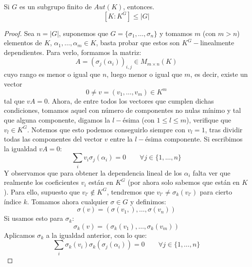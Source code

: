 \begin{prop}[Artin]
    Si $G$ es un subgrupo finito de $Aut(K)$, entonces.
    \begin{equation*}
        \left[K:K^G\right] \leq |G|
    \end{equation*}
    \begin{proof}
        Sea $n=|G|$, suponemos que $G = \{\sigma_1, \ldots, \sigma_n\}$ y tomamos $m$ (con $m>n$) elementos de $K$, $\alpha_1,\ldots,\alpha_m \in K$, basta probar que estos son $K^G-$linealmente dependientes. Para verlo, formamos la matriz:
        \begin{equation*}
            A = (\sigma_{j}(\alpha_i))_{i,j} \in  M_{m\times n}(K)
        \end{equation*}
        cuyo rango es menor o igual que $n$, luego menor o igual que $m$, es decir, existe un vector
        \begin{equation*}
            0\neq v = (v_1, \ldots, v_m) \in K^m
        \end{equation*}
        tal que $vA = 0$. Ahora, de entre todos los vectores que cumplen dichas condiciones, tomamos aquel con número de componentes no nulas mínimo y tal que alguna componente, digamos la $l-$ésima (con $1\leq l\leq m$), verifique que $v_l \in K^G$. Notemos que esto podemos conseguirlo siempre con $v_l = 1$, tras dividir todas las componentes del vector $v$ entre la $l-$ésima componente. Si escribimos la igualdad $vA = 0$:
        \begin{equation*}
            \sum_i v_i \sigma_j(\alpha_i) = 0 \qquad \forall j \in \{1,\ldots,n\}
        \end{equation*}
        Y observamos que para obtener la dependencia lineal de los $\alpha_i$ falta ver que realmente los coeficientes $v_i$ están en $K^G$ (por ahora solo sabemos que están en $K$). Para ello, supuesto que $v_{l'}\notin K^G$, tendremos que $v_{l'} \neq \sigma_k(v_{l'})$ para cierto índice $k$. Tomamos ahora cualquier $\sigma\in G$ y definimos:
        \begin{equation*}
            \sigma(v) = (\sigma(v_1,), \ldots, \sigma(v_n))
        \end{equation*}
        Si usamos esto para $\sigma_k$:
        \begin{equation*}
            \sigma_k(v) = (\sigma_k(v_1), \ldots, \sigma_k(v_m))
        \end{equation*}
        Aplicamos $\sigma_k$ a la igualdad anterior, con lo que:
        \begin{equation*}
            \sum_i \sigma_k(v_i) \sigma_k(\sigma_j(\alpha_i)) = 0 \qquad \forall j \in \{1,\ldots,n\}

\end{equation*}
\end{proof}
\end{prop}
